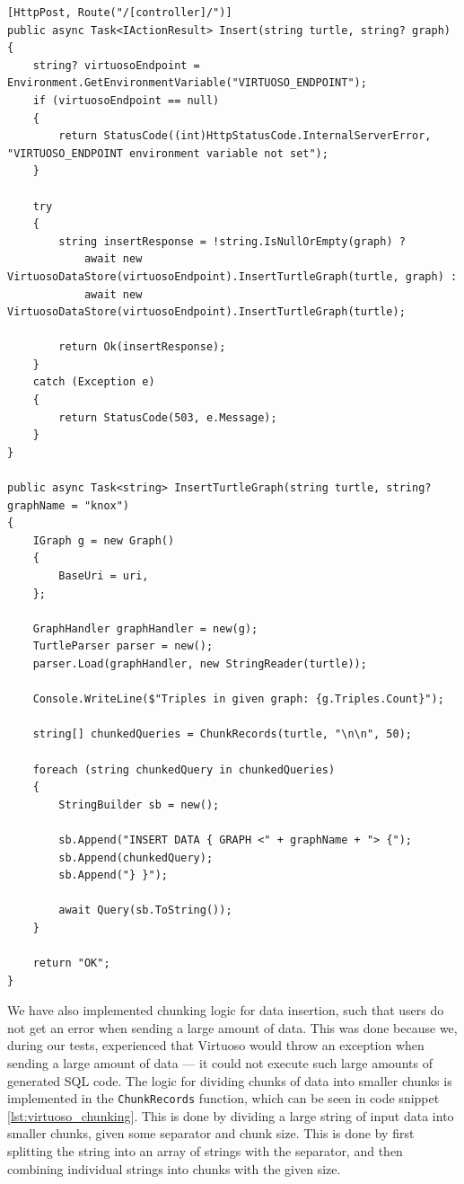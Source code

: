 \begin{lstlisting}[language=CSharp, caption={Data insertion endpoint and data insertion logic}, label={lst:virtuoso_data_insertion}]
[HttpPost, Route("/[controller]/")]
public async Task<IActionResult> Insert(string turtle, string? graph)
{
    string? virtuosoEndpoint = Environment.GetEnvironmentVariable("VIRTUOSO_ENDPOINT");
    if (virtuosoEndpoint == null)
    {
        return StatusCode((int)HttpStatusCode.InternalServerError, "VIRTUOSO_ENDPOINT environment variable not set");
    }

    try
    {
        string insertResponse = !string.IsNullOrEmpty(graph) ?
            await new VirtuosoDataStore(virtuosoEndpoint).InsertTurtleGraph(turtle, graph) :
            await new VirtuosoDataStore(virtuosoEndpoint).InsertTurtleGraph(turtle);

        return Ok(insertResponse);
    }
    catch (Exception e)
    {
        return StatusCode(503, e.Message);
    }
}

public async Task<string> InsertTurtleGraph(string turtle, string? graphName = "knox")
{
    IGraph g = new Graph()
    {
        BaseUri = uri,
    };
    
    GraphHandler graphHandler = new(g);
    TurtleParser parser = new();
    parser.Load(graphHandler, new StringReader(turtle));
    
    Console.WriteLine($"Triples in given graph: {g.Triples.Count}");

    string[] chunkedQueries = ChunkRecords(turtle, "\n\n", 50);

    foreach (string chunkedQuery in chunkedQueries)
    {
        StringBuilder sb = new();
        
        sb.Append("INSERT DATA { GRAPH <" + graphName + "> {");
        sb.Append(chunkedQuery);
        sb.Append("} }");

        await Query(sb.ToString());
    }

    return "OK";
}
\end{lstlisting}


We have also implemented chunking logic for data insertion, such that users do not get an error when sending a large amount of data. This was done because we, during our tests, experienced that Virtuoso would throw an exception when sending a large amount of data --- it could not execute such large amounts of generated SQL code. The logic for dividing chunks of data into smaller chunks is implemented in the \texttt{ChunkRecords} function, which can be seen in code snippet \ref{lst:virtuoso_chunking}. This is done by dividing a large string of input data into smaller chunks, given some separator and chunk size. This is done by first splitting the string into an array of strings with the separator, and then combining individual strings into chunks with the given size.

